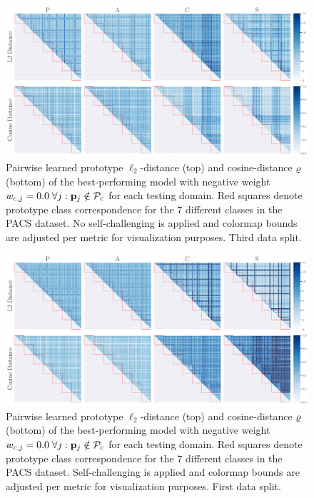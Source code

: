 \begin{figure}[ht]
    \centering
    \includegraphics[width=\textwidth]{Figures/Chapter4/2021-01-21-ProDropIncorrectWeight0.0SAVEResNet18oracle_validation_trial2.pdf}
    \caption[Third data split pairwise prototype distances with $w_{c,j} = 0.0$] {Pairwise learned prototype $\ell_2$-distance (top) and cosine-distance $\varrho$ (bottom) of the best-performing model with negative weight $w_{c,j} = 0.0\; \forall j: \mathbf{p}_{j} \notin \mathcal{P}_c$ for each testing domain. Red squares denote prototype class correspondence for the $7$ different classes in the PACS dataset. No self-challenging is applied and colormap bounds are adjusted per metric for visualization purposes. Third data split.}
    \label{fig:pw_distance_0.0_trial2}
\end{figure}


\begin{figure}[ht]
    \centering
    \includegraphics[width=\textwidth]{Figures/Chapter4/2021-01-21-ProDropIncorrectWeight0.0WithSCdrop_f0.5SAVEResNet18oracle_validation_trial0.pdf}
    \caption[First data split pairwise self-challenging prototype distances with $w_{c,j} = 0.0$] {Pairwise learned prototype $\ell_2$-distance (top) and cosine-distance $\varrho$ (bottom) of the best-performing model with negative weight $w_{c,j} = 0.0\; \forall j: \mathbf{p}_{j} \notin \mathcal{P}_c$ for each testing domain. Red squares denote prototype class correspondence for the $7$ different classes in the PACS dataset. Self-challenging is applied and colormap bounds are adjusted per metric for visualization purposes. First data split.}
    \label{fig:pw_distance_0.0_trial0-sc}
\end{figure}

